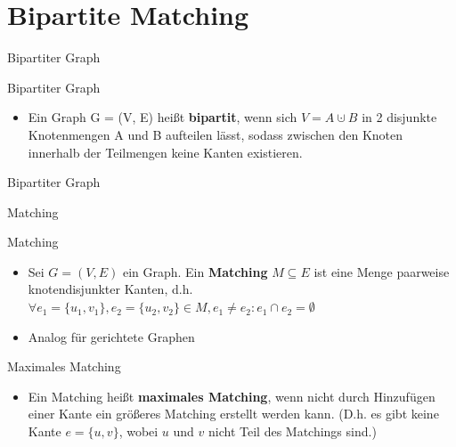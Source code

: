 \documentclass[18pt]{beamer}
\begin{document}
\section{Bipartite Matching}
\begin{frame}{Bipartiter Graph}
\begin{block}{Bipartiter Graph}
\begin{itemize}
\item Ein Graph G = (V, E) hei{\ss}t \textbf{bipartit}, wenn sich $V = A \cupdot B$ in 2 disjunkte Knotenmengen A und B aufteilen l\"asst,
sodass zwischen den Knoten innerhalb der Teilmengen keine Kanten existieren.
\end{itemize}
\end{block}
\end{frame}

\begin{frame}{Bipartiter Graph}
\begin{center}
\end{center}
\end{frame}

\begin{frame}{Matching}
\begin{block}{Matching}
\begin{itemize}
\item Sei $G = (V, E)$ ein Graph. Ein \textbf{Matching} $M \subseteq E$ ist eine Menge paarweise knotendisjunkter Kanten,
d.h. $\forall e_{1} = \{u_{1}, v_{1}\}, e_{2} = \{u_{2}, v_{2}\} \in M, e_{1} \neq e_{2}: e_{1} \cap e_{2} = \emptyset$
\item Analog f\"ur gerichtete Graphen
\end{itemize}
\end{block}

\pause

\begin{block}{Maximales Matching}
\begin{itemize}
\item Ein Matching hei{\ss}t \textbf{maximales Matching}, wenn nicht durch Hinzuf\"ugen einer Kante ein gr\"o{\ss}eres Matching erstellt werden kann.
(D.h. es gibt keine Kante $e = \{u, v\}$, wobei $u$ und $v$ nicht Teil des Matchings sind.)
\end{itemize}
\end{block}
\end{frame}
\end{document}
